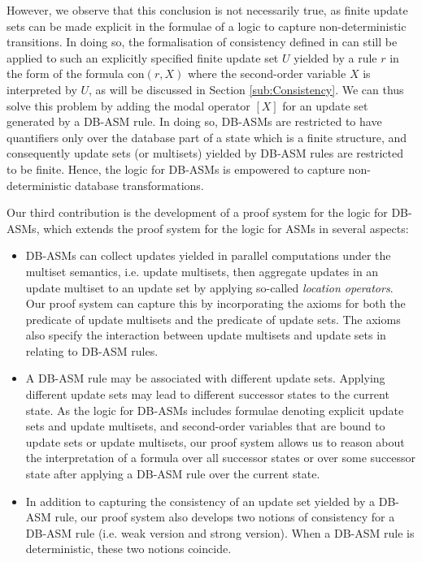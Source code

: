 \documentclass[preprint,11pt]{elsarticle}
\theoremstyle{definition}
\theoremstyle{remark}
\begin{document}
However, we observe that this conclusion is not necessarily true, as
finite update sets can be made explicit in the formulae of a logic
to capture non-deterministic transitions. In doing so, the
formalisation of consistency defined in \cite{RobertLogicASM} can
still be applied to such an explicitly specified finite update set $U$
yielded by a rule $r$ in the form of the formula con$(r,X)$ where the second-order variable $X$ is interpreted by $U$, as will be discussed in Section \ref{sub:Consistency}. We can thus solve
this problem by adding the modal operator $[X]$ for an
update set generated by a DB-ASM rule. In doing so, DB-ASMs are restricted to have quantifiers only over the
database part of a state which is a finite structure, and consequently update sets
(or multisets) yielded by DB-ASM rules are restricted to be
finite.
Hence, the logic for DB-ASMs is empowered to capture
non-deterministic database transformations.

Our third contribution is the development of a proof system for the
logic for DB-ASMs, which extends the proof system for the logic for
ASMs \cite{RobertLogicASM} in several aspects:

 \begin{itemize}

   \item DB-ASMs can collect updates yielded in parallel computations under the
multiset semantics, i.e. update multisets, then aggregate
updates in an update multiset to an update set by applying so-called \emph{location
operators}. Our proof system can capture this by incorporating the
axioms for both the predicate of update multisets and the predicate
of update sets. The axioms also specify the interaction between
update multisets and update sets in relating to DB-ASM rules.

   \item A DB-ASM rule may be associated
with different update sets. Applying different update sets
may lead to different successor states to the current
state. As the logic for DB-ASMs includes formulae denoting explicit
update sets and update multisets, and second-order variables that are
bound to update sets or update multisets, our proof system allows us to
reason about the interpretation of a formula over all successor
states or over some successor state after applying a DB-ASM rule
over the current state.

 \item In addition to capturing the consistency of an update set yielded by a DB-ASM rule, our proof system also develops two notions of consistency for a DB-ASM rule (i.e. weak version and strong version). When a DB-ASM rule is deterministic, these two notions coincide.

 \end{itemize}
\end{document}

